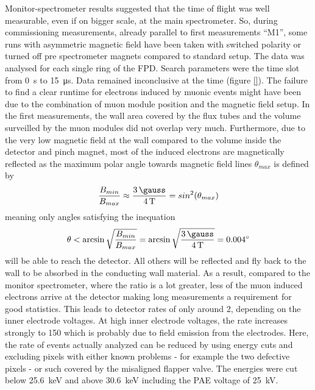   Monitor-spectrometer results suggested that the time of flight was well measurable, even if on bigger scale, at the main spectrometer. So, during commissioning measurements, already parallel to first measurements ``M1'', some runs with asymmetric magnetic field have been taken with switched polarity or turned off pre spectrometer magnets compared to standard setup.
  The data was analysed for each single ring of the FPD. Search parameters were the time slot from \SI{0}{\second} to \SI{15}{\micro\second}. Data remained inconclusive at the time (figure \ref{}). 
  The failure to find a clear runtime for electrons induced by muonic events might have been due to the combination of muon module position and the magnetic field setup. In the first measurements, the wall area covered by the flux tubes and the volume surveilled by the muon modules did not overlap very much. Furthermore, due to the very low magnetic field at the wall compared to the volume inside the detector and pinch magnet, most of the induced electrons are magnetically reflected as the maximum polar angle towards magnetic field lines $\theta_{max}$ is defined by
  \begin{equation}
  	\frac{B_{min}}{B_{max}} \approx \frac{\SI{3}{\gauss}}{\SI{4}{\tesla}} = sin^2(\theta_{max})
  \end{equation}
  meaning only angles satisfying the inequation
  \begin{equation}
  	\theta < \arcsin{\sqrt{\frac{B_{min}}{B_{max}}}} = \arcsin{\sqrt{\frac{\SI{3}{\gauss}}{\SI{4}{\tesla}}}} = \SI{0.004}{\degree}
  \end{equation}
	will be able to reach the detector. All others will be reflected and fly back to the wall to be absorbed in the conducting wall material. 
	As a result, compared to the monitor spectrometer, where the ratio is a lot greater, less of the muon induced electrons arrive at the detector making long measurements a requirement for good statistics. This leads to detector rates of only around \SI{2}{\cps}, depending on the inner electrode voltages.
	At high inner electrode voltages, the rate increases strongly to \SI{150}{\cps} which is probably due to field emission from the electrodes. Here, the rate of events actually analyzed can be reduced by using energy cuts and excluding pixels with either known problems - for example the two defective pixels - or such covered by the misaligned flapper valve. The energies were cut below \SI{25.6}{\kilo\electronvolt} and above \SI{30.6}{\kilo\electronvolt} including the PAE voltage of \SI{25}{\kilo\volt}.
  
